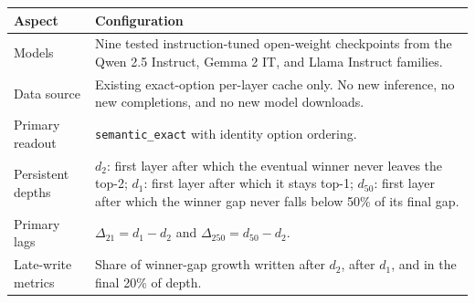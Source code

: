 \begin{tabularx}{\linewidth}{@{}lX@{}}
\toprule
\textbf{Aspect} & \textbf{Configuration}\\
\midrule
Models & Nine tested instruction-tuned open-weight checkpoints from the Qwen 2.5 Instruct, Gemma 2 IT, and Llama Instruct families. \\
Data source & Existing exact-option per-layer cache only. No new inference, no new completions, and no new model downloads. \\
Primary readout & \texttt{semantic\_exact} with identity option ordering. \\
Persistent depths & $d_2$: first layer after which the eventual winner never leaves the top-2; $d_1$: first layer after which it stays top-1; $d_{50}$: first layer after which the winner gap never falls below 50\% of its final gap. \\
Primary lags & $\Delta_{21}=d_1-d_2$ and $\Delta_{250}=d_{50}-d_2$. \\
Late-write metrics & Share of winner-gap growth written after $d_2$, after $d_1$, and in the final 20\% of depth. \\
\bottomrule
\end{tabularx}
